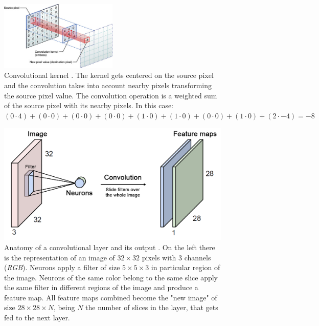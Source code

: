 \begin{figure}[htb]
  \begin{center}
    \includegraphics[width=0.5\textwidth]{gfx/kernel}
  \end{center}
  \caption{Convolutional kernel \cite{Apple}. The kernel gets centered on the source pixel and the convolution takes into account nearby pixels transforming the source pixel value. The convolution operation is a weighted sum of the source pixel with its nearby pixels. In this case:\\
    $(0\cdot4)+(0\cdot0)+(0\cdot0)
     +(0\cdot0)+(1\cdot0)+(1\cdot0)
     +(0\cdot0)+(1\cdot0)+(2\cdot-4) = -8$
  }
  \label{fig:sec:concepts:kernel}
\end{figure}

\begin{figure}[htb]
  \includegraphics[width=\textwidth]{gfx/conv-layer-2}
  \caption{Anatomy of a convolutional layer and its output \cite{Guerzhoy2016}. On the left there is the representation of an image of ${32}\times{32}$ pixels with $3$ channels (\emph{RGB}). Neurons apply a filter of size ${5}\times{5}\times{3}$ in particular region of the image. Neurons of the same color belong to the same slice apply the same filter in different regions of the image and produce a feature map. All feature maps combined become the "new image" of size ${28}\times{28}\times{N}$, being $N$ the number of slices in the layer, that gets fed to the next layer.}
  \label{fig:sec:concepts:conv-layer-2}
\end{figure}

